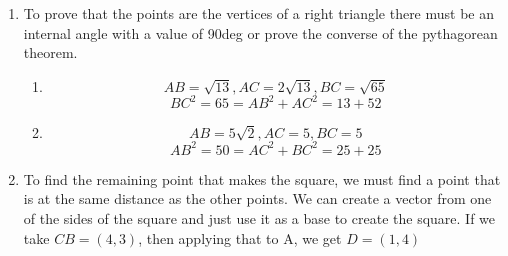 \begin{enumerate}
    \item [37.] To prove that the points are the vertices of a right triangle there must be an internal angle with a value of 90deg or prove the converse of the pythagorean theorem.
          \begin{enumerate}
              \item
                    \[AB = \sqrt{13}, AC=2\sqrt{13}, BC=\sqrt{65}\]
                    \[BC^2 = 65 = AB^2 + AC^2 = 13 + 52\]
              \item
                    \[AB = 5\sqrt{2}, AC=5, BC=5\]
                    \[AB^2 = 50 = AC^2 + BC^2 = 25 + 25\]
          \end{enumerate}

    \item [38.] To find the remaining point that makes the square, we must find a point that is at the same distance as the other points. We can create a vector from one of the sides of the square and just use it as a base to create the square.
          If we take $CB=(4,3)$, then applying that to A, we get $D=(1, 4)$

\end{enumerate}